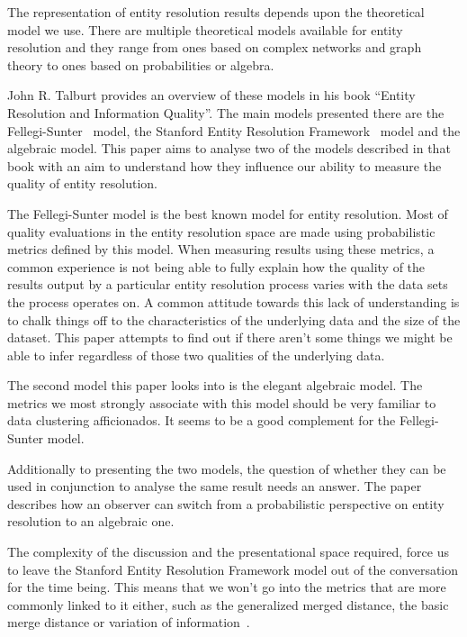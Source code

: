 \documentclass[journal]{IEEEtran}
\begin{document}
    The representation of entity resolution results depends upon the theoretical
    model we use.
    There are multiple theoretical models available for entity resolution and
    they range from ones based on complex networks and graph theory\cite{Li2020}
    to ones based on probabilities\cite{fs1969} or
    algebra\cite{Tal11,Ben2009Swoosh}.

    John R. Talburt provides an overview of these models in his book ``Entity
    Resolution and Information Quality''\cite{Tal11}.
    The main models presented there are the Fellegi-Sunter~\cite{fs1969} model,
    the Stanford Entity Resolution Framework~\cite{Ben2009Swoosh} model and the
    algebraic\cite{tal2007algebraic} model.
    This paper aims to analyse two of the models described in that book with an
    aim to understand how they influence our ability to measure the quality of
    entity resolution.

    The Fellegi-Sunter model is the best known model for entity resolution.
    Most of quality evaluations in the entity resolution space are made using
    probabilistic metrics defined by this model.
    When measuring results using these metrics, a common experience is not being
    able to fully explain how the quality of the results output by a particular
    entity resolution process varies with the data sets the process operates on.
    A common attitude towards this lack of understanding is to chalk things off
    to the characteristics of the underlying data and the size of the dataset.
    This paper attempts to find out if there aren't some things we might be able
    to infer regardless of those two qualities of the underlying data.

    The second model this paper looks into is the elegant algebraic model.
    The metrics we most strongly associate with this model should be very
    familiar to data clustering afficionados.
    It seems to be a good complement for the Fellegi-Sunter model.

    Additionally to presenting the two models, the question of whether they can
    be used in conjunction to analyse the same result needs an answer.
    The paper describes how an observer can switch from a probabilistic
    perspective on entity resolution to an algebraic one.

    The complexity of the discussion and the presentational space required,
    force us to leave the Stanford Entity Resolution Framework model out of the
    conversation for the time being.
    This means that we won't go into the metrics that are more commonly linked
    to it either, such as the generalized merged distance, the basic merge
    distance or variation of information~\cite{Men10}.
\end{document}
